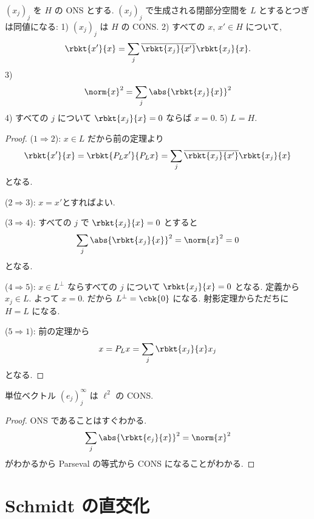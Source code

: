 \documentclass[openany, a4paper, oneside]{jsbook}
\begin{document}
\begin{thm}
 $(x_j)_j$  を $H$ の ONS とする.
 $(x_j)_j$ で生成される閉部分空間を $L$ とするとつぎは同値になる:
 1) $(x_j)_j$ は $H$ の CONS.
 2) すべての $x$, $x' \in H$ について,
    \begin{align}
     \rbkt{x'}{x}
     =
     \sum_j \overline{\rbkt{x_j}{x'}} \rbkt{x_j}{x}.
    \end{align}
 3) 
    \begin{align}
     \norm{x}^2
     =
     \sum_j \abs{\rbkt{x_j}{x}}^2
    \end{align}
 4) すべての $j$ について $\rbkt{x_j}{x} = 0$ ならば $x=0$.
 5) $L=H$.
\end{thm}
\begin{proof}
(\textbf{$1 \Rightarrow 2$}):
$x \in L$ だから前の定理より
\begin{align}
 \rbkt{x'}{x}
 =
 \rbkt{P_L x'}{P_L x}
 =
 \sum_j \overline{\rbkt{x_j}{x'}} \rbkt{x_j}{x}
\end{align}
となる.

(\textbf{$2 \Rightarrow 3$}):
$x = x'$とすればよい.

(\textbf{$3 \Rightarrow 4$}):
すべての $j$ で $\rbkt{x_j}{x} = 0$ とすると
\begin{align}
 \sum_j \abs{\rbkt{x_j}{x}}^2
 =
 \norm{x}^2
 =
 0
\end{align}
となる.

(\textbf{$4 \Rightarrow 5$}):
$x \in L^{\perp}$ ならすべての $j$ について $\rbkt{x_j}{x} = 0$ となる.
定義から $x_j \in L$.
よって $x=0$.
だから $L^{\perp} = \cbk{0}$ になる.
射影定理からただちに $H=L$ になる.

(\textbf{$5 \Rightarrow 1$}):
前の定理から
\begin{align}
 x
 =
 P_L x
 =
 \sum_j \rbkt{x_j}{x} x_j
\end{align}
となる.
\end{proof}

\begin{ex}
単位ベクトル
$(e_j)_j^{\infty}$ は $\ell^2$ の CONS.
\end{ex}
\begin{proof}
ONS であることはすぐわかる.
\begin{align}
 \sum_j \abs{\rbkt{e_j}{x}}^2
 =
 \norm{x}^2
\end{align}
がわかるから Parseval の等式から CONS になることがわかる.
\end{proof}
\section{Schmidt の直交化}
\end{document}

